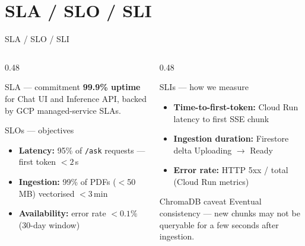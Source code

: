 \documentclass[aspectratio=169]{beamer}
\begin{document}
\section{SLA / SLO / SLI}

\begin{frame}[t,shrink=3]{SLA / SLO / SLI}
  \begin{columns}[t]
    \begin{column}{0.48\textwidth}
      \begin{block}{SLA — commitment}
        {\small \textbf{99.9\% uptime} for Chat UI and Inference API,
        backed by GCP managed-service SLAs.}
      \end{block}
      \vspace{0.2cm}
      \begin{block}{SLOs — objectives}
        \begin{itemize}\setlength\itemsep{0.2em}
          \item \textbf{Latency:} 95\% of \texttt{/ask} requests —
                first token $<\!2\,$s
          \item \textbf{Ingestion:} 99\% of PDFs ($<$50 MB)
                vectorised $<\!3\,$min
          \item \textbf{Availability:} error rate $<\!0.1\%$
                (30-day window)
        \end{itemize}
      \end{block}
    \end{column}
    \begin{column}{0.48\textwidth}
      \begin{block}{SLIs — how we measure}
        \begin{itemize}\setlength\itemsep{0.2em}
          \item \textbf{Time-to-first-token:}
                Cloud Run latency to first SSE chunk
          \item \textbf{Ingestion duration:}
                Firestore delta Uploading $\to$ Ready
          \item \textbf{Error rate:}
                HTTP 5xx / total (Cloud Run metrics)
        \end{itemize}
      \end{block}
      \vspace{0.2cm}
      \begin{alertblock}{ChromaDB caveat}
        {\small Eventual consistency — new chunks may not be
        queryable for a few seconds after ingestion.}
      \end{alertblock}
    \end{column}
  \end{columns}
\end{frame}
\end{document}
